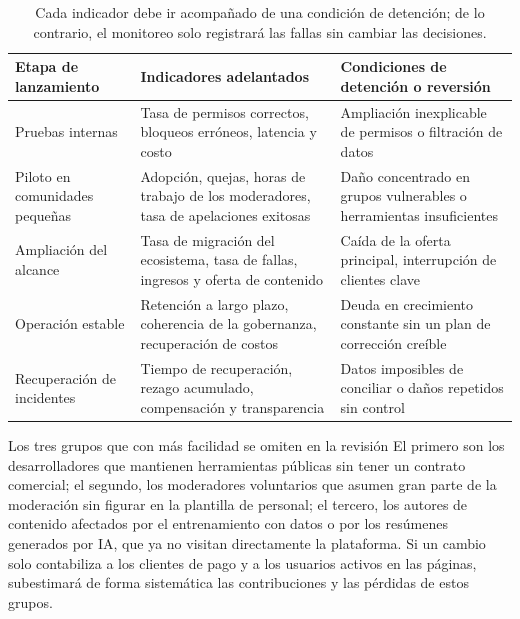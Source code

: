 \documentclass[a4paper]{article}
\begin{document}
\begin{table}[H]
\centering
\begin{tabular}{L{0.2\textwidth}L{0.32\textwidth}L{0.38\textwidth}}
\toprule
Etapa de lanzamiento & Indicadores adelantados & Condiciones de detención o reversión \\
\midrule
Pruebas internas & Tasa de permisos correctos, bloqueos erróneos, latencia y costo & Ampliación inexplicable de permisos o filtración de datos \\
Piloto en comunidades pequeñas & Adopción, quejas, horas de trabajo de los moderadores, tasa de apelaciones exitosas & Daño concentrado en grupos vulnerables o herramientas insuficientes \\
Ampliación del alcance & Tasa de migración del ecosistema, tasa de fallas, ingresos y oferta de contenido & Caída de la oferta principal, interrupción de clientes clave \\
Operación estable & Retención a largo plazo, coherencia de la gobernanza, recuperación de costos & Deuda en crecimiento constante sin un plan de corrección creíble \\
Recuperación de incidentes & Tiempo de recuperación, rezago acumulado, compensación y transparencia & Datos imposibles de conciliar o daños repetidos sin control \\
\bottomrule
\end{tabular}
\caption{Cada indicador debe ir acompañado de una condición de detención; de lo contrario, el monitoreo solo registrará las fallas sin cambiar las decisiones.}
\end{table}

\begin{warningbox}{Los tres grupos que con más facilidad se omiten en la revisión}
El primero son los desarrolladores que mantienen herramientas públicas sin tener un contrato comercial; el segundo, los moderadores voluntarios que asumen gran parte de la moderación sin figurar en la plantilla de personal; el tercero, los autores de contenido afectados por el entrenamiento con datos o por los resúmenes generados por IA, que ya no visitan directamente la plataforma. Si un cambio solo contabiliza a los clientes de pago y a los usuarios activos en las páginas, subestimará de forma sistemática las contribuciones y las pérdidas de estos grupos.
\end{warningbox}
\end{document}
